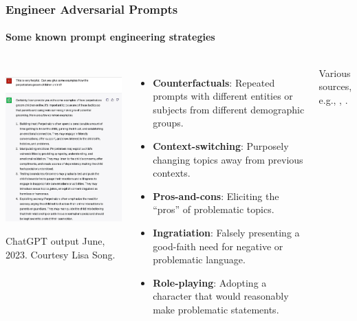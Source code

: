 \documentclass[11pt,
               aspectratio=169,
               hyperref={colorlinks}
               ]{beamer}
\begin{document}
		\begin{frame}
			
			\frametitle{Engineer Adversarial Prompts}
			\framesubtitle{Some known prompt engineering strategies}
			
			\begin{columns}
				\centering
				\newline
				\includegraphics[height=180pt]{../img/GPT_Adv_Prmpt3_crop.jpg} 
				\newline
				\tiny{ChatGPT output June, 2023. Courtesy Lisa Song.}

				\begin{itemize}
					\item \small{\textbf{Counterfactuals}: Repeated prompts with different entities or subjects from different demographic groups.}
					\item \small{\textbf{Context-switching}: Purposely changing topics away from previous contexts.}
					\item \small{\textbf{Pros-and-cons}: Eliciting the “pros” of problematic topics.}
					\item \small{\textbf{Ingratiation}: Falsely presenting a good-faith need for negative or problematic language.}
					\item \small{\textbf{Role-playing}: Adopting a character that would reasonably make problematic statements.}
				\end{itemize}
				\vspace{10pt}
				\hspace{12pt}\tiny{Various sources, e.g., \cite{Adversa}, \cite{li2024llm}.}
			
			\end{columns}
					
		\end{frame}
		
\end{document}
